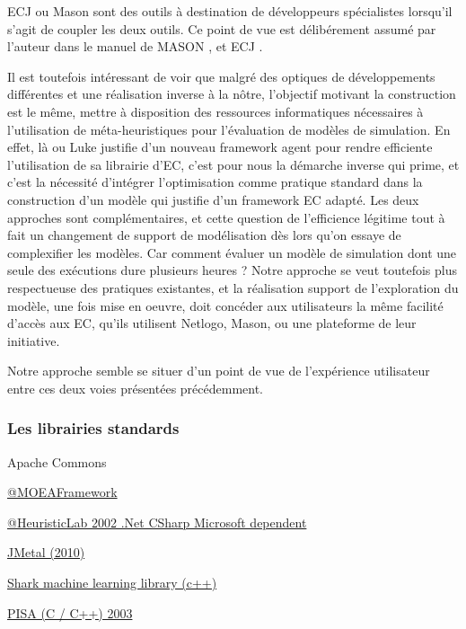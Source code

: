 ECJ ou Mason sont des outils à destination de développeurs spécialistes lorsqu'il s'agit de coupler les deux outils. Ce point de vue est délibérement assumé par l'auteur dans le manuel de MASON , et ECJ .

Il est toutefois intéressant de voir que malgré des optiques de développements différentes et une réalisation inverse à la nôtre, l'objectif motivant la construction est le même, mettre à disposition des ressources informatiques nécessaires à l'utilisation de méta-heuristiques pour l'évaluation de modèles de simulation. En effet, là ou Luke justifie d'un nouveau framework agent pour rendre efficiente l'utilisation de sa librairie d'EC, c'est pour nous la démarche inverse qui prime, et c'est la nécessité d'intégrer l'optimisation comme pratique standard dans la construction d'un modèle qui justifie d'un framework EC adapté. Les deux approches sont complémentaires, et cette question de l'efficience légitime tout à fait un changement de support de modélisation dès lors qu'on essaye de complexifier les modèles. Car comment évaluer un modèle de simulation dont une seule des exécutions dure plusieurs heures ? Notre approche se veut toutefois plus respectueuse des pratiques existantes, et la réalisation support de l'exploration du modèle, une fois mise en oeuvre, doit concéder aux utilisateurs la même facilité d'accès aux EC, qu'ils utilisent Netlogo, Mason, ou une plateforme de leur initiative.

Notre approche semble se situer d'un point de vue de l'expérience utilisateur entre ces deux voies présentées précédemment.

\subsubsection{Les librairies standards}

Apache Commons

\href{http://www.moeaframework.org/}{@MOEAFramework}

\href{http://dev.heuristiclab.com/}{@HeuristicLab 2002 .Net CSharp Microsoft dependent}

\href{http://jmetal.sourceforge.net/}{JMetal (2010)}

\href{http://image.diku.dk/shark/sphinx_pages/build/html/index.html}{Shark machine learning library (c++)}

\href{http://www.tik.ee.ethz.ch/sop/pisa/?page=documentation.php}{PISA (C / C++) 2003}

